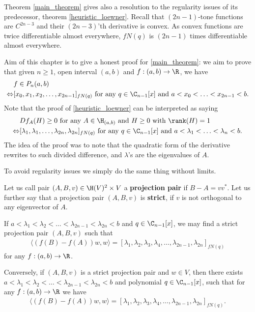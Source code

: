 Theorem \ref{main_theorem} gives also a resolution to the regularity issues of its predecessor, theorem \ref{heuristic_loewner}. Recall that $(2 n - 1)$-tone functions are $C^{2 n - 3}$ and their $(2 n - 3)$'th derivative is convex. As convex functions are twice differentiable almost everywhere, $f N(q)$ is $(2 n - 1)$ times differentiable almost everywhere.

Aim of this chapter is to give a honest proof for \ref{main_theorem}: we aim to prove that given $n \geq 1$, open interval $(a, b)$ and $f : (a, b) \to \R$, we have 
\begin{align*}
	& f \in P_{n}(a, b) \\
	\Leftrightarrow &[x_{0}, x_{1}, x_{2}, \ldots, x_{2 n - 1}]_{f N(q)} \text{ for any $q \in \C_{n - 1}[x]$ and $a < x_{0} < \ldots < x_{2 n - 1} < b$}.
\end{align*}
Note that the proof of \ref{heuristic_loewner} can be interpreted as saying
\begin{align*}
	& D f_{A}(H) \geq 0 \text{ for any $A \in \H_{(a, b)}$ and $H \geq 0$ with $\rank(H) = 1$} \\
	\Leftrightarrow &[\lambda_{1}, \lambda_{1}, \ldots, \lambda_{2 n}, \lambda_{2 n}]_{f N(q)} \text{ for any $q \in \C_{n - 1}[x]$ and $a < \lambda_{1} < \ldots < \lambda_{n} < b$}.
\end{align*}
The idea of the proof was to note that the quadratic form of the derivative rewrites to such divided difference, and $\lambda$'s are the eigenvalues of $A$.

To avoid regularity issues we simply do the same thing without limits.

\begin{maar}
	Let us call pair $(A, B, v) \in \H(V)^{2} \times V$ a \textbf{projection pair} if $B - A = v v^{*}$. Let us further say that a projection pair $(A, B, v)$ is \textbf{strict}, if $v$ is not orthogonal to any eigenvector of $A$. 
\end{maar}

\begin{lem}\label{main_lemma}
	If $a < \lambda_{1} < \lambda_{2} < \ldots < \lambda_{2 n - 1} < \lambda_{2 n} < b$ and $q \in \C_{n - 1}[x]$, we may find a strict projection pair $(A, B, v)$ such that
	\begin{align*}
		\langle (f(B) - f(A)) w, w \rangle = [\lambda_{1}, \lambda_{2}, \lambda_{3}, \lambda_{4}, \ldots, \lambda_{2n - 1}, \lambda_{2 n}]_{f N(q)}
	\end{align*}
	for any $f : (a, b) \to \R$.

	Conversely, if $(A, B, v)$ is a strict projection pair and $w \in V$, then there exists $a < \lambda_{1} < \lambda_{2} < \ldots < \lambda_{2 n - 1} < \lambda_{2 n} < b$ and polynomial $q \in \C_{n - 1}[x]$, such that for any $f : (a, b) \to \R$ we have
	\begin{align*}
		\langle (f(B) - f(A)) w, w \rangle = [\lambda_{1}, \lambda_{2}, \lambda_{3}, \lambda_{4}, \ldots, \lambda_{2n - 1}, \lambda_{2 n}]_{f N(q)}.
	\end{align*}
\end{lem}


